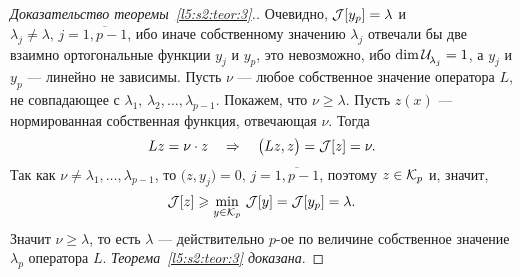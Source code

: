\begin{proof}[Доказательство теоремы~\ref{l5:s2:teor:3}.]
	Очевидно, $\J[y_p]=\lambda$ и $\lambda_j\neq\lambda,\,j=\overline{1,p-1}$, ибо иначе собственному значению $\lambda_j$ отвечали бы две взаимно ортогональные функции $y_j$ и $y_p$, это невозможно, ибо $\dim\Ul[\lambda_j]=1$, а $y_j$ и $y_p$ --- линейно не зависимы. Пусть $\nu$ --- любое собственное значение оператора $L$, не совпадающее с $\lambda_1,\,\lambda_2,\ldots,\lambda_{p-1}$. Покажем, что $\nu\geqslant\lambda$. Пусть $z(x)$ --- нормированная собственная функция, отвечающая $\nu$. Тогда 
	\begin{equation*}
		\hfill Lz=\nu\cdot z\quad\Rightarrow\quad\big(Lz,z\big)=\J[z]=\nu.\hfill
	\end{equation*} 
	Так как $\nu\neq\lambda_1,\ldots,\lambda_{p-1}$, то $\big(z,y_j\big)=0,\,j=\overline{1,p-1}$, поэтому $z\in\K_p$ и, значит,
	\begin{equation*}
		\hfill\J[z]\geqslant\min\limits_{y\in\K_p}\,\J[y]=\J[y_p]=\lambda.\hfill
	\end{equation*} 
	Значит $\nu\geqslant\lambda$, то есть $\lambda$ --- действительно $p$-ое по величине собственное значение $\lambda_p$ оператора $L$. \emph{Теорема~\ref{l5:s2:teor:3} доказана}. 
\end{proof}

